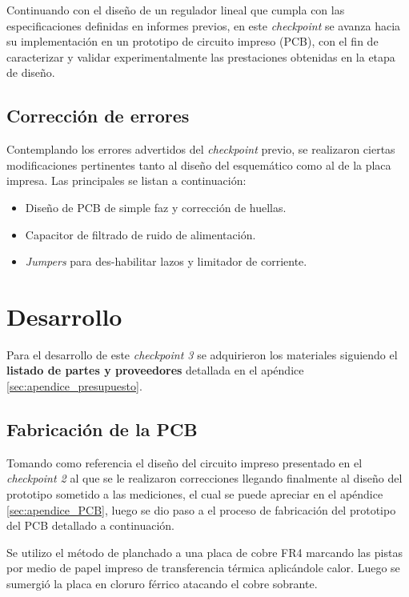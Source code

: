 \documentclass[]{article}
\begin{document}
	Continuando con el diseño de un regulador lineal que cumpla con las especificaciones definidas en informes previos, en este \textit{checkpoint} se avanza hacia su implementación en un prototipo de circuito impreso (PCB), con el fin de caracterizar y validar experimentalmente las prestaciones obtenidas en la etapa de diseño.
	
		
	\subsection{Corrección de errores}
	
	Contemplando los errores advertidos del \textit{checkpoint} previo, se realizaron ciertas modificaciones pertinentes tanto al diseño del esquemático como al de la placa impresa. Las principales se listan a continuación:
	
	\begin{itemize}
		\item Diseño de PCB de simple faz y corrección de huellas.
		\item Capacitor de filtrado de ruido de alimentación.
		\item \textit{Jumpers} para des-habilitar lazos y limitador de corriente.
	\end{itemize}
	
	
	\section{Desarrollo}
	
	Para el desarrollo de este \textit{checkpoint 3} se adquirieron los materiales siguiendo el \textbf{listado de partes y proveedores} detallada en el apéndice \ref{sec:apendice_presupuesto}.
	

	

	
	\subsection{Fabricación de la PCB}
	
	Tomando como referencia el diseño del circuito impreso presentado en el \textit{checkpoint 2} al que se le realizaron correcciones llegando finalmente al diseño del prototipo sometido a las mediciones, el cual se puede apreciar en el apéndice \ref{sec:apendice_PCB}, luego se dio paso a el proceso de fabricación del prototipo del PCB detallado a continuación.
	
	Se utilizo el método de planchado a una placa de cobre FR4 marcando las pistas por medio de papel impreso de transferencia térmica aplicándole calor. Luego se sumergió la placa en cloruro férrico atacando el cobre sobrante.
		
\end{document}

